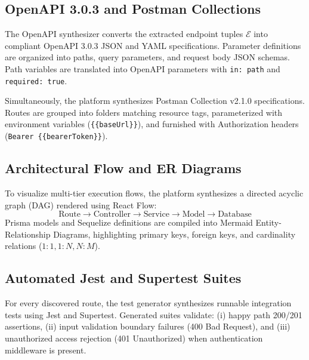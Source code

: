 \documentclass[a4paper,10pt]{article}
\begin{document}
\subsection{OpenAPI 3.0.3 and Postman Collections}
\noindent
The OpenAPI synthesizer converts the extracted endpoint tuples $\mathcal{E}$ into compliant OpenAPI 3.0.3 JSON and YAML specifications. Parameter definitions are organized into paths, query parameters, and request body JSON schemas. Path variables are translated into OpenAPI parameters with \texttt{in: path} and \texttt{required: true}.

Simultaneously, the platform synthesizes Postman Collection v2.1.0 specifications. Routes are grouped into folders matching resource tags, parameterized with environment variables (\texttt{\{\{baseUrl\}\}}), and furnished with Authorization headers (\texttt{Bearer \{\{bearerToken\}\}}).

\subsection{Architectural Flow and ER Diagrams}
\noindent
To visualize multi-tier execution flows, the platform synthesizes a directed acyclic graph (DAG) rendered using React Flow:
\begin{equation}
\text{Route} \longrightarrow \text{Controller} \longrightarrow \text{Service} \longrightarrow \text{Model} \longrightarrow \text{Database}
\end{equation}
Prisma models and Sequelize definitions are compiled into Mermaid Entity-Relationship Diagrams, highlighting primary keys, foreign keys, and cardinality relations ($1:1, 1:N, N:M$).

\subsection{Automated Jest and Supertest Suites}
\noindent
For every discovered route, the test generator synthesizes runnable integration tests using Jest and Supertest. Generated suites validate: (i) happy path 200/201 assertions, (ii) input validation boundary failures (400 Bad Request), and (iii) unauthorized access rejection (401 Unauthorized) when authentication middleware is present.
\end{document}
